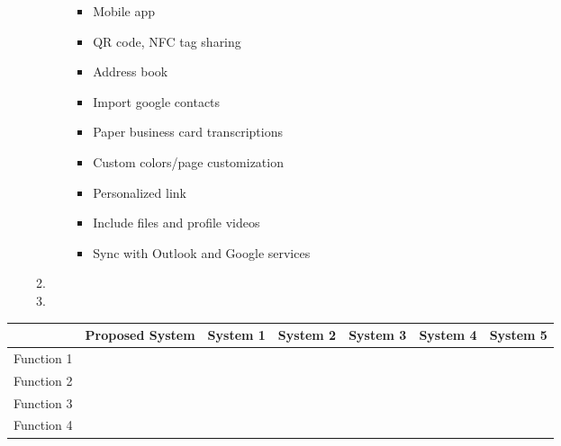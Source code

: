 \documentclass[12pt]{article}%
\begin{document}
\begin{enumerate}
\begin{enumerate}
\begin{enumerate}
                \begin{itemize}
                    \item Mobile app
                    \item QR code, NFC tag sharing
                    \item Address book
                    \item Import google contacts
                    \item Paper business card transcriptions
                    \item Custom colors/page customization
                    \item Personalized link
                    \item Include files and profile videos
                    \item Sync with Outlook and Google services
                \end{itemize}
            \end{enumerate}
            \item 
            \item
        \end{enumerate}
\end{enumerate}

\begin{center}
    \begin{tabular}{|l|l|l|l|l|l|l|}
        \hline
         & Proposed System & System 1 & System 2 & System 3 & System 4 & System 5 \\
         \hline
        Function 1 & & & & & & \\
        \hline
        Function 2 & & & & & & \\
        \hline
        Function 3 & & & & & & \\
        \hline
        Function 4 & & & & & & \\
         \hline
    \end{tabular}
\end{center}

\end{document}

